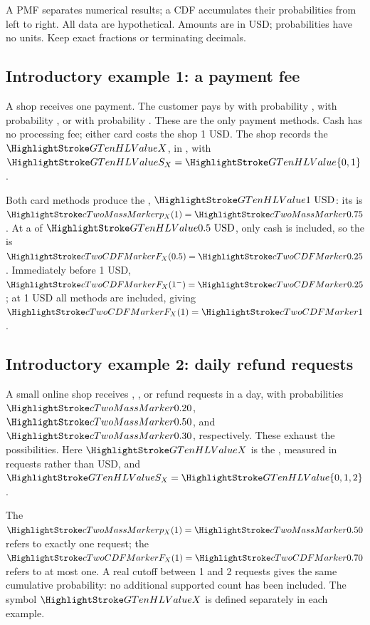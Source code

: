 A PMF separates numerical results; a CDF accumulates their probabilities from left to right. All data are hypothetical. Amounts are in USD; probabilities have no units. Keep exact fractions or terminating decimals.
\subsection{Introductory example 1: a payment fee}\label{prob:payment-intro}
A shop receives one payment. The customer pays by  with probability ,  with probability , or  with probability . These are the only payment methods. Cash has no processing fee; either card costs the shop 1 USD. The shop records the  $\cTwoValue{X}$, in , with  $\cTwoValue{S_X}=\cTwoValue{\{0,1\}}$.

Both card methods produce the , $\cTwoValue{1\text{ USD}}$: its  is $\cTwoMassHL{p_X(1)}=\cTwoMassHL{0.75}$. At a  of $\cTwoValue{0.5\text{ USD}}$, only cash is included, so the  is $\cTwoCDFHL{F_X(0.5)}=\cTwoCDFHL{0.25}$. Immediately before 1 USD, $\cTwoCDFHL{F_X(1^-)}=\cTwoCDFHL{0.25}$; at 1 USD all methods are included, giving $\cTwoCDFHL{F_X(1)}=\cTwoCDFHL{1}$.

\subsection{Introductory example 2: daily refund requests}\label{ex:refund-intro}
A small online shop receives , , or  refund requests in a day, with probabilities $\cTwoMassHL{0.20}$, $\cTwoMassHL{0.50}$, and $\cTwoMassHL{0.30}$, respectively. These exhaust the possibilities. Here $\cTwoValue{X}$ is the , measured in requests rather than USD, and $\cTwoValue{S_X}=\cTwoValue{\{0,1,2\}}$.

The  $\cTwoMassHL{p_X(1)}=\cTwoMassHL{0.50}$ refers to exactly one request; the  $\cTwoCDFHL{F_X(1)}=\cTwoCDFHL{0.70}$ refers to at most one. A real cutoff between 1 and 2 requests gives the same cumulative probability: no additional supported count has been included. The symbol $\cTwoValue{X}$ is defined separately in each example.

\clearpage
